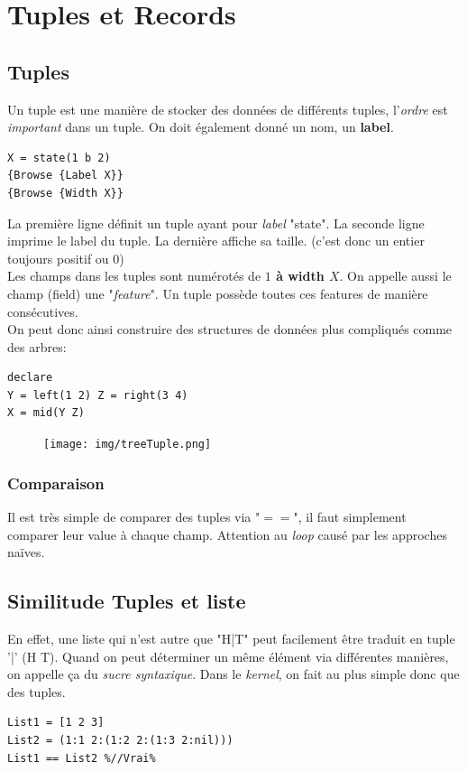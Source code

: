 \documentclass{report}
\begin{document}
\section{Tuples et Records}

\subsection{Tuples}
Un tuple est une manière de stocker des données de différents tuples, l'\textit{ordre} est \textit{important} dans un tuple. On doit également donné un nom, un \textbf{label}.
\begin{lstlisting}
X = state(1 b 2)
{Browse {Label X}}
{Browse {Width X}}
\end{lstlisting}
La première ligne définit un tuple ayant pour \textit{label} "state". La seconde ligne imprime le label du tuple. La dernière affiche sa taille. (c'est donc un entier toujours positif ou $0$)\\
Les champs dans les tuples sont numérotés de\textbf{ $1$ à width $X$}. On appelle aussi le champ (field) une "\textit{feature}". Un tuple possède toutes ces features de manière consécutives.\\

On peut donc ainsi construire des structures de données plus compliqués comme des arbres:
\begin{lstlisting}
declare
Y = left(1 2) Z = right(3 4)
X = mid(Y Z)
\end{lstlisting}

\begin{figure}[H]
\centering
\texttt{[image: img/treeTuple.png]}
\end{figure}
\subsubsection{Comparaison}
Il est très simple de comparer des tuples via "$==$", il faut simplement comparer leur value à chaque champ. Attention au \textit{loop} causé par les approches naïves.\\

\subsection{Similitude Tuples et liste}
En effet, une liste qui n'est autre que "H|T" peut facilement être traduit en tuple '|' (H T). Quand on peut déterminer un même élément via différentes manières, on appelle ça du \textit{sucre syntaxique}. Dans le \textit{kernel}, on fait au plus simple donc que des tuples.
\begin{lstlisting}[escapechar=\%]
List1 = [1 2 3]
List2 = (1:1 2:(1:2 2:(1:3 2:nil)))
List1 == List2 %//Vrai%
\end{lstlisting}
\end{document}

